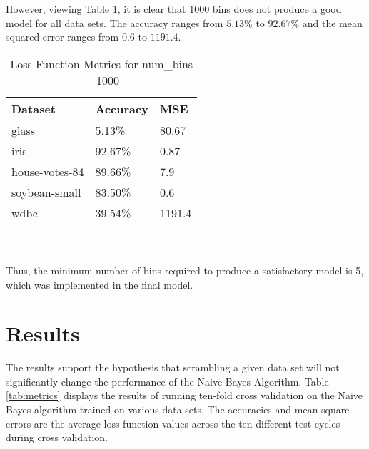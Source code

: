 \documentclass[twoside,11pt]{article}
\begin{document}
However, viewing Table \ref{tab:metrics1000}, it is clear that 1000 bins does not produce a good model for all data sets.
The accuracy ranges from $5.13\%$ to $92.67\%$ and the mean squared error ranges from $0.6$ to $1191.4$.
\begin{table}[h]
	\centering
	\caption{Loss Function Metrics for num\_bins = 1000} \label{tab:metrics1000}
	\begin{tabular}{|l|l|l|}
		\hline
		Dataset                  & Accuracy & MSE    \\ \hline
		glass                    & 5.13\%   & 80.67  \\ \hline
		iris                     & 92.67\%  & 0.87   \\ \hline
		house-votes-84           & 89.66\%  & 7.9    \\ \hline
		soybean-small            & 83.50\%  & 0.6    \\ \hline
		wdbc                     & 39.54\%  & 1191.4 \\ \hline
	\end{tabular}
\end{table} \\\\
Thus, the minimum number of bins required to produce a satisfactory model is 5, which was implemented in the final model.

\section{Results}

The results support the hypothesis that scrambling a given data set will not significantly change the performance of the Naive Bayes Algorithm. Table \ref{tab:metrics} displays the results of running ten-fold cross validation on the Naive Bayes algorithm trained on various data sets. The accuracies and mean square errors are the average loss function values across the ten different test cycles during cross validation.
\end{document}
